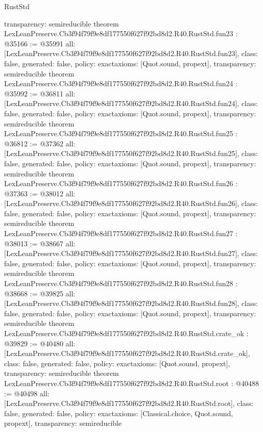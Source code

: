 \begin{lexlean}{RustStd}
\begin{coremodule}
{  transparency: semireducible
}
theorem LexLeanPreserve.Cb3f94f79f9e8df177550f627f92bd8d2.R40.RustStd.fun23 : @35166 := @35991 {
  all: [LexLeanPreserve.Cb3f94f79f9e8df177550f627f92bd8d2.R40.RustStd.fun23],
  class: false,
  generated: false,
  policy: exact{axioms: [Quot.sound, propext]},
  transparency: semireducible
}
theorem LexLeanPreserve.Cb3f94f79f9e8df177550f627f92bd8d2.R40.RustStd.fun24 : @35992 := @36811 {
  all: [LexLeanPreserve.Cb3f94f79f9e8df177550f627f92bd8d2.R40.RustStd.fun24],
  class: false,
  generated: false,
  policy: exact{axioms: [Quot.sound, propext]},
  transparency: semireducible
}
theorem LexLeanPreserve.Cb3f94f79f9e8df177550f627f92bd8d2.R40.RustStd.fun25 : @36812 := @37362 {
  all: [LexLeanPreserve.Cb3f94f79f9e8df177550f627f92bd8d2.R40.RustStd.fun25],
  class: false,
  generated: false,
  policy: exact{axioms: [Quot.sound, propext]},
  transparency: semireducible
}
theorem LexLeanPreserve.Cb3f94f79f9e8df177550f627f92bd8d2.R40.RustStd.fun26 : @37363 := @38012 {
  all: [LexLeanPreserve.Cb3f94f79f9e8df177550f627f92bd8d2.R40.RustStd.fun26],
  class: false,
  generated: false,
  policy: exact{axioms: [Quot.sound, propext]},
  transparency: semireducible
}
theorem LexLeanPreserve.Cb3f94f79f9e8df177550f627f92bd8d2.R40.RustStd.fun27 : @38013 := @38667 {
  all: [LexLeanPreserve.Cb3f94f79f9e8df177550f627f92bd8d2.R40.RustStd.fun27],
  class: false,
  generated: false,
  policy: exact{axioms: [Quot.sound, propext]},
  transparency: semireducible
}
theorem LexLeanPreserve.Cb3f94f79f9e8df177550f627f92bd8d2.R40.RustStd.fun28 : @38668 := @39825 {
  all: [LexLeanPreserve.Cb3f94f79f9e8df177550f627f92bd8d2.R40.RustStd.fun28],
  class: false,
  generated: false,
  policy: exact{axioms: [Quot.sound, propext]},
  transparency: semireducible
}
theorem LexLeanPreserve.Cb3f94f79f9e8df177550f627f92bd8d2.R40.RustStd.crate_ok : @39829 := @40480 {
  all: [LexLeanPreserve.Cb3f94f79f9e8df177550f627f92bd8d2.R40.RustStd.crate_ok],
  class: false,
  generated: false,
  policy: exact{axioms: [Quot.sound, propext]},
  transparency: semireducible
}
theorem LexLeanPreserve.Cb3f94f79f9e8df177550f627f92bd8d2.R40.RustStd.root : @40488 := @40498 {
  all: [LexLeanPreserve.Cb3f94f79f9e8df177550f627f92bd8d2.R40.RustStd.root],
  class: false,
  generated: false,
  policy: exact{axioms: [Classical.choice, Quot.sound, propext]},
  transparency: semireducible
}


\end{coremodule}
\end{lexlean}
